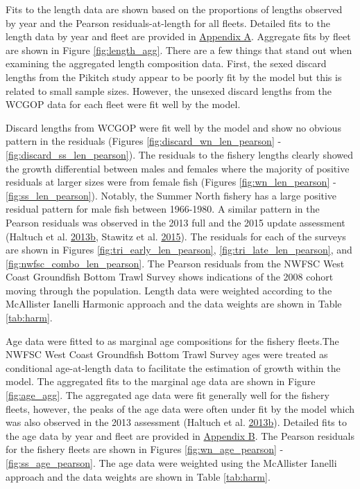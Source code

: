 \documentclass[12pt,]{article}
\begin{document}
Fits to the length data are shown based on the proportions of lengths
observed by year and the Pearson residuals-at-length for all fleets.
Detailed fits to the length data by year and fleet are provided in
\protect\hyperlink{append_a}{Appendix A}. Aggregate fits by fleet are
shown in Figure \ref{fig:length_agg}. There are a few things that stand
out when examining the aggregated length composition data. First, the
sexed discard lengths from the Pikitch study appear to be poorly fit by
the model but this is related to small sample sizes. However, the
unsexed discard lengths from the WCGOP data for each fleet were fit well
by the model.

Discard lengths from WCGOP were fit well by the model and show no
obvious pattern in the residuals (Figures
\ref{fig:discard_wn_len_pearson} - \ref{fig:discard_ss_len_pearson}).
The residuals to the fishery lengths clearly showed the growth
differential between males and females where the majority of positive
residuals at larger sizes were from female fish (Figures
\ref{fig:wn_len_pearson} - \ref{fig:ss_len_pearson}). Notably, the
Summer North fishery has a large positive residual pattern for male fish
between 1966-1980. A similar pattern in the Pearson residuals was
observed in the 2013 full and the 2015 update assessment (Haltuch et al.
\protect\hyperlink{ref-haltuch_status_2013}{2013}\protect\hyperlink{ref-haltuch_status_2013}{b},
Stawitz et al. \protect\hyperlink{ref-stawitz_stock_2015}{2015}). The
residuals for each of the surveys are shown in Figures
\ref{fig:tri_early_len_pearson}, \ref{fig:tri_late_len_pearson}, and
\ref{fig:nwfsc_combo_len_pearson}. The Pearson residuals from the NWFSC
West Coast Groundfish Bottom Trawl Survey shows indications of the 2008
cohort moving through the population. Length data were weighted
according to the McAllister Ianelli Harmonic approach and the data
weights are shown in Table \ref{tab:harm}.

Age data were fitted to as marginal age compositions for the fishery
fleets.The NWFSC West Coast Groundfish Bottom Trawl Survey ages were
treated as conditional age-at-length data to facilitate the estimation
of growth within the model. The aggregated fits to the marginal age data
are shown in Figure \ref{fig:age_agg}. The aggregated age data were fit
generally well for the fishery fleets, however, the peaks of the age
data were often under fit by the model which was also observed in the
2013 assessment (Haltuch et al.
\protect\hyperlink{ref-haltuch_status_2013}{2013}\protect\hyperlink{ref-haltuch_status_2013}{b}).
Detailed fits to the age data by year and fleet are provided in
\protect\hyperlink{append_b}{Appendix B}. The Pearson residuals for the
fishery fleets are shown in Figures \ref{fig:wn_age_pearson} -
\ref{fig:ss_age_pearson}. The age data were weighted using the
McAllister Ianelli approach and the data weights are shown in Table
\ref{tab:harm}.
\end{document}
